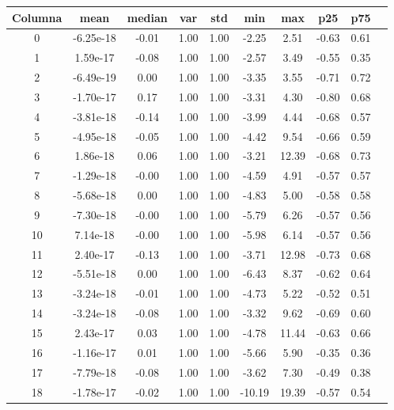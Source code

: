 \documentclass[11pt]{article}
\begin{document}
\begin{table}[H]
\centering
\begin{tabular}{|c|c|c|c|c|c|c|c|c|c|}
\hline
\textbf{Columna} &       \textbf{mean} &        \textbf{median} &           \textbf{var} &       \textbf{std} &        \textbf{min} &          \textbf{max} &       \textbf{p25} &       \textbf{p75} \\
\hline
0               &-6.25e-18 &-0.01  &1.00  &1.00 & -2.25 &  2.51 &-0.63  &0.61 \\
1               & 1.59e-17 &-0.08  &1.00  &1.00 & -2.57 &  3.49 &-0.55  &0.35 \\
2               &-6.49e-19 & 0.00  &1.00  &1.00 & -3.35 &  3.55 &-0.71  &0.72 \\
3               &-1.70e-17 & 0.17  &1.00  &1.00 & -3.31 &  4.30 &-0.80  &0.68 \\
4               &-3.81e-18 &-0.14  &1.00  &1.00 & -3.99 &  4.44 &-0.68  &0.57 \\
5               &-4.95e-18 &-0.05  &1.00  &1.00 & -4.42 &  9.54 &-0.66  &0.59 \\
6               & 1.86e-18 & 0.06  &1.00  &1.00 & -3.21 & 12.39 &-0.68  &0.73 \\
7               &-1.29e-18 &-0.00  &1.00  &1.00 & -4.59 &  4.91 &-0.57  &0.57 \\
8               &-5.68e-18 & 0.00  &1.00  &1.00 & -4.83 &  5.00 &-0.58  &0.58 \\
9               &-7.30e-18 &-0.00  &1.00  &1.00 & -5.79 &  6.26 &-0.57  &0.56 \\
10              & 7.14e-18 &-0.00  &1.00  &1.00 & -5.98 &  6.14 &-0.57  &0.56 \\
11              & 2.40e-17 &-0.13  &1.00  &1.00 & -3.71 & 12.98 &-0.73  &0.68 \\
12              &-5.51e-18 & 0.00  &1.00  &1.00 & -6.43 &  8.37 &-0.62  &0.64 \\
13              &-3.24e-18 &-0.01  &1.00  &1.00 & -4.73 &  5.22 &-0.52  &0.51 \\
14              &-3.24e-18 &-0.08  &1.00  &1.00 & -3.32 &  9.62 &-0.69  &0.60 \\
15              & 2.43e-17 & 0.03  &1.00  &1.00 & -4.78 & 11.44 &-0.63  &0.66 \\
16              &-1.16e-17 & 0.01  &1.00  &1.00 & -5.66 &  5.90 &-0.35  &0.36 \\
17              &-7.79e-18 &-0.08  &1.00  &1.00 & -3.62 &  7.30 &-0.49  &0.38 \\
18              &-1.78e-17 &-0.02  &1.00  &1.00 &-10.19 & 19.39 &-0.57  &0.54 \\

\end{tabular}
\end{table}
\end{document}
